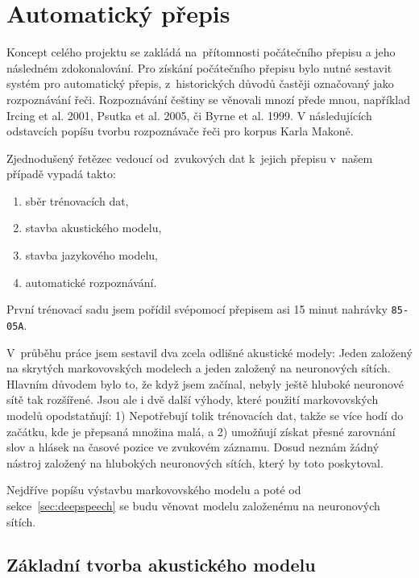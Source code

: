 \chapter{Automatický přepis}
\label{kap:asr}


Koncept celého projektu se zakládá na~přítomnosti počátečního přepisu a jeho
následném zdokonalování. Pro získání počátečního přepisu bylo nutné sestavit
systém pro automatický přepis, z~historických důvodů častěji označovaný jako
rozpoznávání řeči. Rozpoznávání češtiny se věnovali mnozí přede mnou,
například Ircing et al. 2001\cite{ircing2001large}, Psutka et al.
2005\cite{psutka2005automatic}, či Byrne et al. 1999\cite{byrne1999large}.
V následujících odstavcích popíšu tvorbu rozpoznávače řeči pro korpus Karla
Makoně.

Zjednodušený řetězec vedoucí od~zvukových dat k~jejich přepisu v~našem případě
vypadá takto:\begin{enumerate}
\item{sběr trénovacích dat,}
\item{stavba akustického modelu,}
\item{stavba jazykového modelu,}
\item{automatické rozpoznávání.}
\end{enumerate}

První trénovací sadu jsem pořídil svépomocí přepisem asi 15 minut nahrávky
\texttt{85-05A}.

V~průběhu práce jsem sestavil dva zcela odlišné akustické modely: Jeden založený
na skrytých markovovských modelech a jeden založený na neuronových sítích.
Hlavním důvodem bylo to, že když jsem začínal, nebyly ještě hluboké neuronové
sítě tak rozšířené. Jsou ale i dvě další výhody, které použití markovovských
modelů opodstatňují: 1) Nepotřebují tolik trénovacích dat, takže se více hodí do
začátku, kde je přepsaná množina malá, a 2) umožňují získat přesné zarovnání
slov a hlásek na časové pozice ve zvukovém záznamu. Dosud neznám žádný nástroj
založený na hlubokých neuronových sítích, který by toto poskytoval.

Nejdříve popíšu výstavbu markovovského modelu a poté od
sekce~\ref{sec:deepspeech} se budu věnovat modelu založenému na neuronových
sítích.

\section{Základní tvorba akustického modelu}

